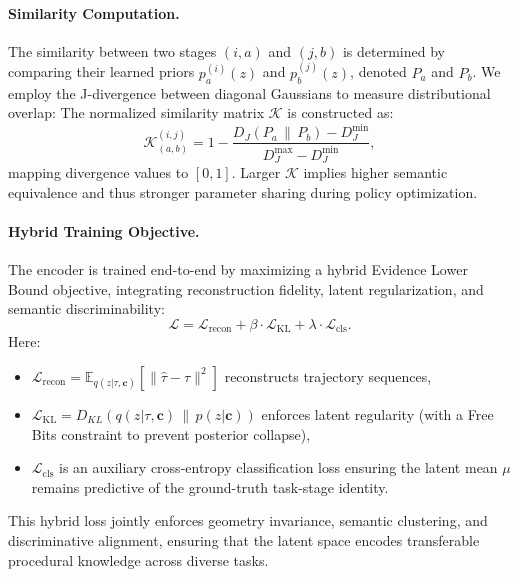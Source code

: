 \documentclass{article}
\begin{document}
\paragraph{Similarity Computation.}
The similarity between two stages $(i,a)$ and $(j,b)$ is determined by comparing their learned priors $p^{(i)}_{a}(z)$ and $p^{(j)}_{b}(z)$, denoted $P_a$ and $P_b$. 
We employ the J-divergence between diagonal Gaussians to measure distributional overlap:
The normalized similarity matrix $\mathcal{K}$ is constructed as:
\begin{equation}
\mathcal{K}^{(i,j)}_{(a,b)} = 1 - \frac{D_{J}(P_a \,\|\, P_b) - D_{J}^{\min}}{D_{J}^{\max} - D_{J}^{\min}},
\end{equation}
mapping divergence values to $[0,1]$. 
Larger $\mathcal{K}$ implies higher semantic equivalence and thus stronger parameter sharing during policy optimization.

\paragraph{Hybrid Training Objective.}
The encoder is trained end-to-end by maximizing a hybrid Evidence Lower Bound  objective, integrating reconstruction fidelity, latent regularization, and semantic discriminability:
\begin{equation}
\mathcal{L} = \mathcal{L}_{\mathrm{recon}} + \beta \cdot \mathcal{L}_{\mathrm{KL}} + \lambda \cdot \mathcal{L}_{\mathrm{cls}}.
\end{equation}
Here:
\begin{itemize}
    \item $\mathcal{L}_{\mathrm{recon}} = \mathbb{E}_{q(z|\tau, \mathbf{c})}[\|\hat{\tau} - \tau\|^2]$ reconstructs trajectory sequences,
    \item $\mathcal{L}_{\mathrm{KL}} = D_{KL}(q(z|\tau,\mathbf{c})\,\|\,p(z|\mathbf{c}))$ enforces latent regularity (with a Free Bits constraint to prevent posterior collapse),
    \item $\mathcal{L}_{\mathrm{cls}}$ is an auxiliary cross-entropy classification loss ensuring the latent mean $\mu$ remains predictive of the ground-truth task-stage identity.
\end{itemize}

This hybrid loss jointly enforces geometry invariance, semantic clustering, and discriminative alignment, ensuring that the latent space encodes transferable procedural knowledge across diverse tasks.
\end{document}

